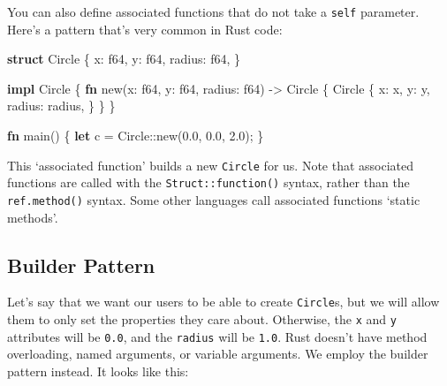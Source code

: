 \documentclass[a4paper,]{book}
\newenvironment{Shaded}{\begin{snugshade}}{\end{snugshade}}
\newcommand{\KeywordTok}[1]{\textcolor[rgb]{0.13,0.29,0.53}{\textbf{{#1}}}}
\newcommand{\DataTypeTok}[1]{\textcolor[rgb]{0.13,0.29,0.53}{{#1}}}
\newcommand{\DecValTok}[1]{\textcolor[rgb]{0.00,0.00,0.81}{{#1}}}
\newcommand{\NormalTok}[1]{{#1}}
\begin{document}
You can also define associated functions that do not take a
\texttt{self} parameter. Here's a pattern that's very common in Rust
code:

\begin{Shaded}
\begin{Highlighting}[]
\KeywordTok{struct} \NormalTok{Circle \{}
    \NormalTok{x: }\DataTypeTok{f64}\NormalTok{,}
    \NormalTok{y: }\DataTypeTok{f64}\NormalTok{,}
    \NormalTok{radius: }\DataTypeTok{f64}\NormalTok{,}
\NormalTok{\}}

\KeywordTok{impl} \NormalTok{Circle \{}
    \KeywordTok{fn} \NormalTok{new(x: }\DataTypeTok{f64}\NormalTok{, y: }\DataTypeTok{f64}\NormalTok{, radius: }\DataTypeTok{f64}\NormalTok{) -> Circle \{}
        \NormalTok{Circle \{}
            \NormalTok{x: x,}
            \NormalTok{y: y,}
            \NormalTok{radius: radius,}
        \NormalTok{\}}
    \NormalTok{\}}
\NormalTok{\}}

\KeywordTok{fn} \NormalTok{main() \{}
    \KeywordTok{let} \NormalTok{c = Circle::new(}\DecValTok{0.0}\NormalTok{, }\DecValTok{0.0}\NormalTok{, }\DecValTok{2.0}\NormalTok{);}
\NormalTok{\}}
\end{Highlighting}
\end{Shaded}

This `associated function' builds a new \texttt{Circle} for us. Note
that associated functions are called with the
\texttt{Struct::function()} syntax, rather than the
\texttt{ref.method()} syntax. Some other languages call associated
functions `static methods'.

\subsection{Builder Pattern}\label{builder-pattern}

Let's say that we want our users to be able to create \texttt{Circle}s,
but we will allow them to only set the properties they care about.
Otherwise, the \texttt{x} and \texttt{y} attributes will be
\texttt{0.0}, and the \texttt{radius} will be \texttt{1.0}. Rust doesn't
have method overloading, named arguments, or variable arguments. We
employ the builder pattern instead. It looks like this:
\end{document}
